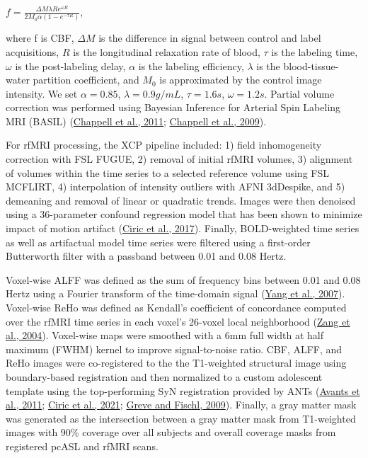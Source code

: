 \documentclass[
  12pt,
]{article}
\begin{document}
\(f = \frac{\Delta M \lambda R e^{\omega R}}{2 M_0 \alpha(1-e^{- \tau R})}\),

where f is CBF, \(\Delta M\) is the difference in signal between control and label acquisitions, \(R\) is the longitudinal relaxation rate of blood, \(\tau\) is the labeling time, \(\omega\) is the post-labeling delay, \(\alpha\) is the labeling efficiency, \(\lambda\) is the blood-tissue-water partition coefficient, and \(M_0\) is approximated by the control image intensity. We set \(\alpha = 0.85\), \(\lambda = 0.9g/mL\), \(\tau = 1.6s\), \(\omega = 1.2s\). Partial volume correction was performed using Bayesian Inference for Arterial Spin Labeling MRI (BASIL) (\protect\hyperlink{ref-chappell_partial_2011}{Chappell et al., 2011}; \protect\hyperlink{ref-chappell_variational_2009}{Chappell et al., 2009}).

For rfMRI processing, the XCP pipeline included: 1) field inhomogeneity correction with FSL FUGUE, 2) removal of initial rfMRI volumes, 3) alignment of volumes within the time series to a selected reference volume using FSL MCFLIRT, 4) interpolation of intensity outliers with AFNI 3dDespike, and 5) demeaning and removal of linear or quadratic trends. Images were then denoised using a 36-parameter confound regression model that has been shown to minimize impact of motion artifact (\protect\hyperlink{ref-ciricBenchmarkingParticipantlevelConfound2017}{Ciric et al., 2017}). Finally, BOLD-weighted time series as well as artifactual model time series were filtered using a first-order Butterworth filter with a passband between 0.01 and 0.08 Hertz.

Voxel-wise ALFF was defined as the sum of frequency bins between 0.01 and 0.08 Hertz using a Fourier transform of the time-domain signal (\protect\hyperlink{ref-yangAmplitudeLowFrequency2007}{Yang et al., 2007}). Voxel-wise ReHo was defined as Kendall's coefficient of concordance computed over the rfMRI time series in each voxel's 26-voxel local neighborhood (\protect\hyperlink{ref-zangRegionalHomogeneityApproach2004}{Zang et al., 2004}). Voxel-wise maps were smoothed with a 6mm full width at half maximum (FWHM) kernel to improve signal-to-noise ratio. CBF, ALFF, and ReHo images were co-registered to the the T1-weighted structural image using boundary-based registration and then normalized to a custom adolescent template using the top-performing SyN registration provided by ANTs (\protect\hyperlink{ref-avantsReproducibleEvaluationANTs2011}{Avants et al., 2011}; \protect\hyperlink{ref-ciricTemplateFlowFAIRsharingMultiscale2021}{Ciric et al., 2021}; \protect\hyperlink{ref-greveAccurateRobustBrain2009}{Greve and Fischl, 2009}). Finally, a gray matter mask was generated as the intersection between a gray matter mask from T1-weighted images with 90\% coverage over all subjects and overall coverage masks from registered pcASL and rfMRI scans.
\end{document}
